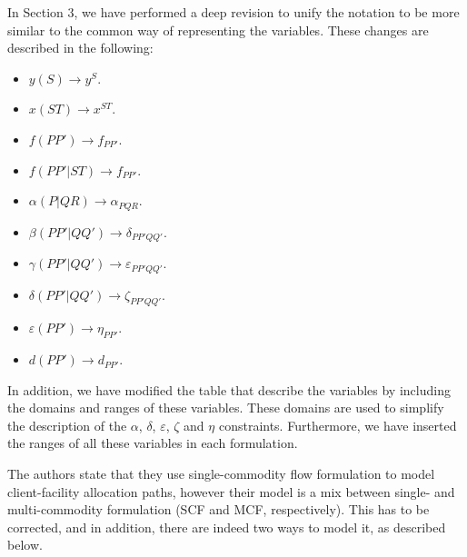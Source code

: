 \documentclass{article}
\newenvironment{reviewer}{\setcounter{pointcounter}{1}}{}
\newcommand{\point}{\text{{\selectfont \thepointcounter} \stepcounter{pointcounter}}}
\begin{document}
\begin{reviewer}
		\begin{tcolorbox}[breakable,enhanced,coltitle=black,colback=green!5!white,colframe=green!75!black,title=\textbf{Answer R2.\point},borderline={1pt}{0pt}{black},boxrule=0pt]
			In Section 3, we have performed a deep revision to unify the notation to be more similar to the common way of representing the variables. These changes are described in the following:
			\begin{itemize}
				\item $y(S)\rightarrow y^S$.
				\item $x(ST)\rightarrow x^{ST}$.
				\item $f(PP')\rightarrow f_{PP'}$.
				\item $f(PP'|ST)\rightarrow f_{PP'}$.
				\item $\alpha(P|QR)\rightarrow \alpha_{PQR}$.
				\item $\beta(PP'|QQ')\rightarrow \delta_{PP'QQ'}$.
				\item $\gamma(PP'|QQ')\rightarrow \varepsilon_{PP'QQ'}$.
				\item $\delta(PP'|QQ')\rightarrow \zeta_{PP'QQ'}$.
				\item $\varepsilon(PP')\rightarrow \eta_{PP'}$.
				\item $d(PP')\rightarrow d_{PP'}$.
			\end{itemize}
			
			In addition, we have modified the table that describe the variables by including the domains and ranges of these variables. These domains are used to simplify the description of the $\alpha$, $\delta$, $\varepsilon$, $\zeta$ and $\eta$ constraints. Furthermore, we have inserted the ranges of all these variables in each formulation.
			
			
		\end{tcolorbox}
			
		\begin{itshape}
			 The authors state that they use single-commodity flow formulation to model client-facility allocation paths, however their model is a mix between single- and multi-commodity formulation (SCF and MCF, respectively). This has to be corrected, and in addition, there are indeed two ways to model it, as described below.
			

\end{itshape}
\end{reviewer}
\end{document}

